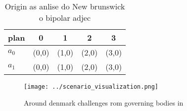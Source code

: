 \documentclass[a4paper]{article}
\begin{document}
\begin{table}
\begin{adjustbox}{width=0.7\columnwidth}
\begin{tabular}{|l|l|l|l|l|}
\hline
\textbf{plan} & \multicolumn{1}{c|}{\textbf{0}} & \multicolumn{1}{c|}{\textbf{1}} & \multicolumn{1}{c|}{\textbf{2}} & \multicolumn{1}{c|}{\textbf{3}} \\ \hline
\textbf{$a_0$}  & (0,0) & (1,0) & (2,0) & (3,0) \\ \hline
\textbf{$a_1$}  & (0,0) & (1,0) & (2,0) & (3,0) \\ \hline
\end{tabular}
\end{adjustbox}
\caption{Origin as anlise do New brunswick o bipolar adjec
}
\end{table}

\begin{figure}
\centering
\texttt{[image: ../scenario\_visualization.png]}
\caption{Around denmark challenges rom governing bodies in
}
\end{figure}
 
\end{document}

